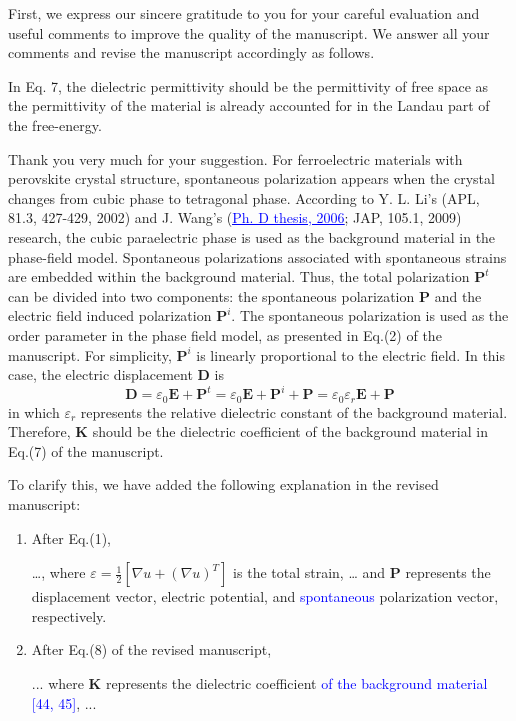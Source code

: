 \documentclass[12pt,fleqn]{article}
\begin{document}
\begin{response}
First, we express our sincere gratitude to you for your careful evaluation and useful comments to improve the quality of the manuscript. We answer all your comments and revise the manuscript accordingly as follows.
\end{response}

\begin{question}{}\label{R1:Q1}
In Eq. 7, the dielectric permittivity should be the permittivity of free space as the permittivity of the material is already accounted for in the Landau part of the free-energy.
\end{question}

\begin{response}
Thank you very much for your suggestion. For ferroelectric materials with perovskite crystal structure, spontaneous polarization appears when the crystal changes from cubic phase to tetragonal phase. According to Y. L. Li’s (APL, 81.3, 427-429, 2002) and J. Wang’s (\href{ https://hdl.handle.net/1783.1/2614}{\textcolor{blue}{\underline{Ph. D thesis, 2006}}}; JAP, 105.1, 2009) research, the cubic paraelectric phase is used as the background material in the phase-field model. Spontaneous polarizations associated with spontaneous strains are embedded within the background material. Thus, the total polarization $\mathbf{P}^t$ can be divided into two components: the spontaneous polarization $\mathbf{P}$ and the electric field induced polarization $\mathbf{P}^i$. The spontaneous polarization is used as the order parameter in the phase field model, as presented in Eq.(2) of the manuscript. For simplicity, $\mathbf{P}^i$ is linearly proportional to the electric field. In this case, the electric displacement $\mathbf{D}$ is
\begin{equation*}
    \mathbf{D}=\varepsilon_0 \mathbf{E}+\mathbf{P}^t=\varepsilon_0 \mathbf{E}+\mathbf{P}^i+\mathbf{P}=\varepsilon_0 \varepsilon_r \mathbf{E}+\mathbf{P}
\end{equation*}
in which $\varepsilon_r$ represents the relative dielectric constant of the background material. Therefore, $\mathbf{K}$ should be the dielectric coefficient of the background material in Eq.(7) of the manuscript.

To clarify this, we have added the following explanation in the revised manuscript:
\begin{enumerate}
    \item After Eq.(1),
    \begin{revised}
        …, where $\varepsilon=\frac{1}{2}\left[ \nabla u+(\nabla u)^T\right]$ is the total strain, … and $\mathbf{P}$ represents the displacement vector, electric potential, and \textcolor{blue}{spontaneous} polarization vector, respectively. 
    \end{revised}
    \item After Eq.(8) of the revised manuscript,
    \begin{revised}
        ... where $\mathbf{K}$ represents the dielectric coefficient \textcolor{blue}{of the background material [44, 45]}, ...
    \end{revised}
\end{enumerate}


\end{response}
\end{document}
